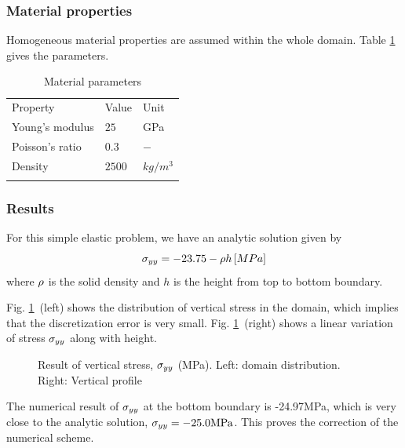 \subsubsection*{Material properties}
Homogeneous material properties are assumed within the whole domain. Table \ref{tme:el2d} gives the parameters.
 \begin{table}[!htb]
\centering
\begin{tabular}{lll}
\hline\hline\noalign{\smallskip}
Property & Value & Unit \\
\noalign{\smallskip}\hline\noalign{\smallskip}
Young's modulus & $25$  &GPa \\
Poisson's ratio & $0.3$             & $-$ \\
Density & $2500$             & $kg/m^3$ \\
\noalign{\smallskip}\hline\hline
\end{tabular}
\caption{Material parameters}
\label{tme:el2d}
\end{table}
%
\subsubsection*{Results}
For this simple elastic problem, we have an analytic solution given by
\begin{equation}
 \sigma_{yy} = -23.75-\rho h\, \mbox[MPa]
  \label{eq:ex1_ana}
\end{equation}
where $\rho$ is the solid density and $h$ is the height from top to bottom boundary.


Fig. \mbox{\ref{fme:e1_syy} (left)} shows the distribution of vertical stress in the domain, which implies that the
 discretization error is very small. Fig. \mbox{\ref{fme:e1_syy} (right)} shows a linear variation of
   stress $\sigma_{yy}$ along with height.
\begin{figure}[!thb]
  \begin{center}
  \end{center}
  \caption{Result of vertical stress, $\sigma_{yy}$ (MPa). Left: domain distribution. Right: Vertical profile }
  \label{fme:e1_syy}
\end{figure}

The numerical result of $\sigma_{yy}$ at the bottom boundary is \mbox{-24.97MPa}, which is very close to
 the analytic solution, $\sigma_{yy}=-25.0\mbox{MPa}$. This proves the correction of the numerical scheme.


